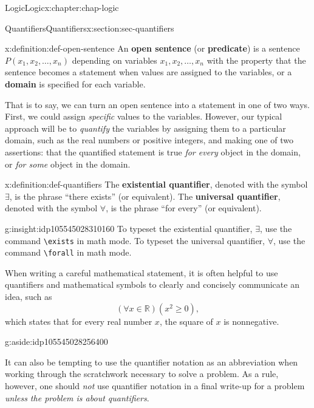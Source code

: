 \documentclass[oneside,10pt,]{book}
\newcommand{\mono}[1]{\texttt{#1}}
\newcommand{\terminology}[1]{\textbf{#1}}
\renewcommand{\ge}{\geqslant}
\def\R{{\mathbb R}}
\newcommand{\R}{\mathbb R}
\begin{document}
\begin{chapterptx}{Logic}{}{Logic}{}{}{x:chapter:chap-logic}
\begin{sectionptx}{Quantifiers}{}{Quantifiers}{}{}{x:section:sec-quantifiers}
\begin{definition}{}{x:definition:def-open-sentence}%
%
An \terminology{open sentence} (or \terminology{predicate}) is a sentence \(P(x_1, x_2, \ldots, x_n)\) depending on variables \(x_1, x_2, \ldots, x_n\) with the property that the sentence becomes a statement when values are assigned to the variables, or a \terminology{domain} is specified for each variable.%
\end{definition}
That is to say, we can turn an open sentence into a statement in one of two ways. First, we could assign \emph{specific} values to the variables. However, our typical approach will be to \emph{quantify} the variables by assigning them to a particular domain, such as the real numbers or positive integers, and making one of two assertions: that the quantified statement is true \emph{for every} object in the domain, or \emph{for some} object in the domain.%
\begin{definition}{}{x:definition:def-quantifiers}%
%
%
The \terminology{existential quantifier}, denoted with the symbol \(\exists\), is the phrase ``there exists'' (or equivalent). The \terminology{universal quantifier}, denoted with the symbol \(\forall\), is the phrase ``for every'' (or equivalent).%
\end{definition}
\begin{insight}{}{g:insight:idp105545028310160}%
%
%
To typeset the existential quantifier, \(\exists\), use the command \mono{\textbackslash{}exists} in math mode. To typeset the universal quantifier, \(\forall\), use the command \mono{\textbackslash{}forall} in math mode.%
\end{insight}
When writing a careful mathematical statement, it is often helpful to use quantifiers and mathematical symbols to clearly and concisely communicate an idea, such as%
%
\begin{equation*}
(\forall x \in \R) (x^2 \ge 0),
\end{equation*}
which states that for every real number \(x\), the square of \(x\) is nonnegative.\begin{aside}{}{g:aside:idp105545028256400}%
\end{aside}
 It can also be tempting to use the quantifier notation as an abbreviation when working through the scratchwork necessary to solve a problem. As a rule, however, one should \emph{not} use quantifier notation in a final write-up for a problem \emph{unless the problem is about quantifiers}.%

\end{sectionptx}
\end{chapterptx}
\end{document}
